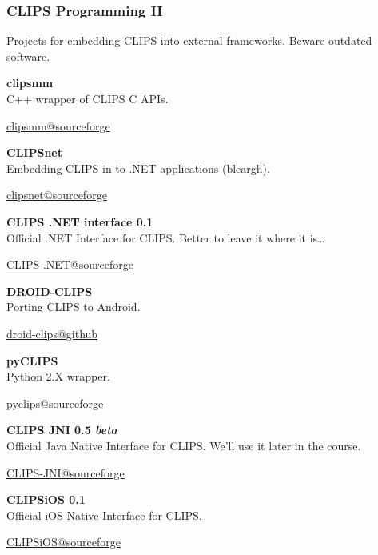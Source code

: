 \documentclass[xcolor={usenames,dvipsnames,svgnames}, compress]{beamer}
\begin{document}
\begin{frame}
  \frametitle{CLIPS Programming II}
  \scriptsize
  Projects for embedding CLIPS into external
  frameworks. Beware outdated software.\par\bigskip
  
  \textbf{clipsmm}\\
  C++ wrapper of CLIPS C APIs.
  \begin{flushright}
    \vspace{-20pt}
    \href{http://clipsmm.sourceforge.net/}{clipsmm@sourceforge}
  \end{flushright}
  \textbf{CLIPSnet}\\
  Embedding CLIPS in to .NET applications (bleargh).
  \begin{flushright}
    \vspace{-20pt}
    \href{http://sourceforge.net/projects/clipsnet/}{clipsnet@sourceforge}
  \end{flushright}
  \textbf{CLIPS .NET interface 0.1}\\
  Official .NET Interface for CLIPS. Better to leave it where it is\dots
  \begin{flushright}
    \vspace{-20pt}
    \href{http://www.clipsrules.net/?q=Downloads/CLIPSNET}{CLIPS-.NET@sourceforge}
  \end{flushright}
  \textbf{DROID-CLIPS}\\
  Porting CLIPS to Android.
  \begin{flushright}
    \vspace{-20pt}
    \href{https://github.com/DrItanium/DROID-CLIPS}{droid-clips@github}
  \end{flushright}
  \textbf{pyCLIPS}\\
  Python 2.X wrapper.
  \begin{flushright}
    \vspace{-20pt}
    \href{http://pyclips.sourceforge.net/web/}{pyclips@sourceforge}
  \end{flushright}
  \textbf{CLIPS JNI 0.5 \emph{beta}}\\
  Official Java Native Interface for CLIPS. We'll use it later in the course.
  \begin{flushright}
    \vspace{-20pt}
    \href{http://clipsrules.sourceforge.net/CLIPSJNIBeta.html}{CLIPS-JNI@sourceforge}
  \end{flushright}
  \textbf{CLIPSiOS 0.1}\\
  Official iOS Native Interface for CLIPS.
  \begin{flushright}
    \vspace{-20pt}
    \href{http://www.clipsrules.net/?q=Downloads/CLIPSiOS}{CLIPSiOS@sourceforge}
  \end{flushright}
  
\end{frame}
\end{document}
